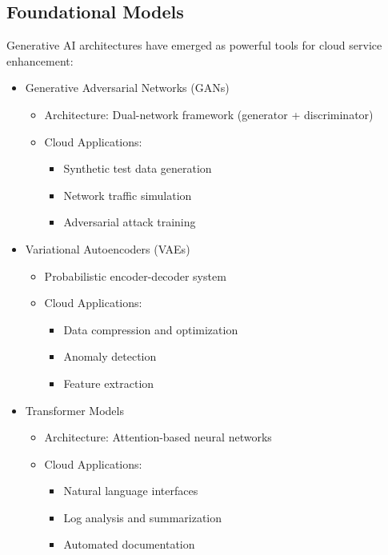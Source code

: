 \documentclass[a4paper,12pt]{article}
\begin{document}
\subsection{Foundational Models}
Generative AI architectures have emerged as powerful tools for cloud service enhancement:
\begin{itemize}
    \item Generative Adversarial Networks (GANs)
          \begin{itemize}
              \item Architecture: Dual-network framework (generator + discriminator)
              \item Cloud Applications:
                    \begin{itemize}
                        \item Synthetic test data generation
                        \item Network traffic simulation
                        \item Adversarial attack training
                    \end{itemize}
          \end{itemize}
    \item Variational Autoencoders (VAEs)
          \begin{itemize}
              \item Probabilistic encoder-decoder system
              \item Cloud Applications:
                    \begin{itemize}
                        \item Data compression and optimization
                        \item Anomaly detection
                        \item Feature extraction
                    \end{itemize}
          \end{itemize}
    \item Transformer Models
          \begin{itemize}
              \item Architecture: Attention-based neural networks
              \item Cloud Applications:
                    \begin{itemize}
                        \item Natural language interfaces
                        \item Log analysis and summarization
                        \item Automated documentation
                    \end{itemize}
          \end{itemize}
\end{itemize}
\end{document}
